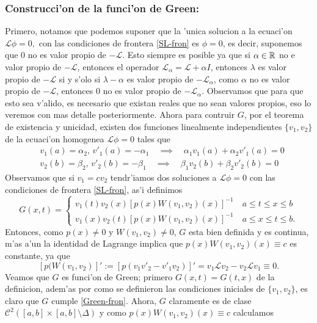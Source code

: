 \documentclass[main.tex]{subfiles}
\begin{document}
\subsubsection*{Construcci'on de la funci'on de Green:}
\noindent Primero, notamos que podemos suponer que la 'unica solucion a la ecuaci'on $\mathcal{L}\phi=0,$ con las condiciones de frontera \ref{SL-fron} es $\phi=0$, es decir, suponemos que $0$ no es valor propio de $-\mathcal{L}$. Esto siempre es posible ya que si $\alpha\in\mathbb R $ no e valor propio de $-\mathcal{L}$, entonces el operador $\mathcal{L}_{\alpha}=\mathcal{L}+\alpha I$, entonces $\lambda$ es valor propio de $-\mathcal{L}$ si y s'olo si $\lambda-\alpha$ es valor propio de $-\mathcal{L_{\alpha}}$, como $\alpha$ no es valor propio de $-\mathcal{L}$, entonces $0$ no es valor propio de $-\mathcal{L}_{\alpha}$. Observamos que para que esto sea v'alido, es necesario que existan reales que no sean valores propios, eso lo veremos con mas detalle posteriormente.
Ahora para contruir $G$, por el teorema de existencia y unicidad, existen dos funciones linealmente independientes $\{v_{1},v_{2}\}$ de la ecuaci'on homogenea $\mathcal{L}\phi=0$ tales que
\begin{align*}
  &v_{1}(a)=\alpha_{2},\,v'_{1}(a)=-\alpha_{1}\quad\implies\quad\alpha_{1}v_{1}(a)+\alpha_{2}v'_{1}(a)=0\\
  &v_{2}(b)=\beta_{2},\,v'_{2}(b)=-\beta_{1}\quad\implies\quad\beta_{1}v_{2}(b)+\beta_{2}v'_{2}(b)=0
\end{align*}
Observamos que si $v_{1}=cv_{2}$ tendr'iamos dos soluciones a $\mathcal{L}\phi=0$ con las condiciones de frontera \ref{SL-fron}, as'i definimos
\begin{equation}
  G(x,t)=\begin{cases}
    v_{1}(t)v_{2}(x)[p(x)W(v_{1},v_{2})(x)]^{-1}\quad a\leq t\leq x\leq b\\
    v_{1}(x)v_{2}(t)[p(x)W(v_{1},v_{2})(x)]^{-1}\quad a\leq x\leq t\leq b.
  \end{cases}
\end{equation}
Entonces, como  $p(x)\neq0$ y $W(v_{1},v_{2})\neq0$, $G$ esta bien definida y es continua, m'as a'un la identidad de Lagrange implica que $p(x)W(v_{1},v_{2})(x)\equiv c$ es constante, ya que
\[
  [p(W(v_{1},v_{2})]':=[p(v_{1}v'_{2}-v'_{1}v_{2})]'=v_{1}\mathcal{L}v_{2}-v_{2}\mathcal{L}v_{1}\equiv 0.
\]
Veamos que $G$ es funci'on de Green; primero $G(x,t)=G(t,x)$ de la definicion, adem'as por como se definieron las condiciones iniciales de $\{v_{1},v_{2}\}$, es claro que $G$ cumple \ref{Green-fron}. Ahora, $G$ claramente es de clase $\mathcal{C}^{2}\left([a,b]\times[a,b]\setminus\Delta\right)$ y como $p(x)W(v_{1},v_{2})(x)\equiv c$ calculamos
\end{document}
